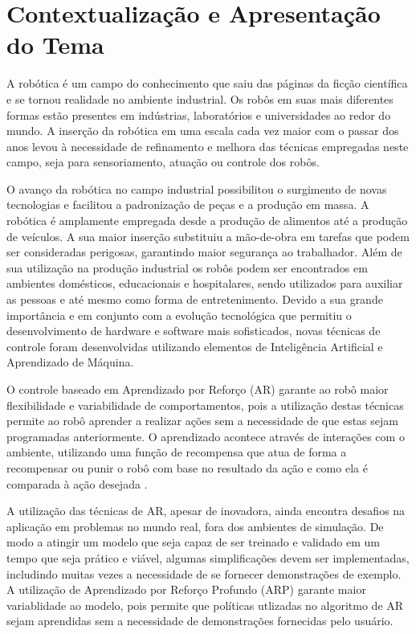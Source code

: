 \documentclass[]{politex}
\begin{document}
\section{Contextualização e Apresentação do Tema}
	A robótica é um campo do conhecimento que saiu das páginas da ficção científica e se tornou realidade no ambiente industrial. Os robôs em suas mais diferentes formas estão presentes em indústrias, laboratórios e universidades ao redor do mundo. A inserção da robótica em uma escala cada vez maior com o passar dos anos levou à necessidade de refinamento e melhora das técnicas empregadas neste campo, seja para sensoriamento, atuação ou controle dos robôs.
	
	O avanço da robótica no campo industrial possibilitou o surgimento de novas tecnologias e facilitou a padronização de peças e a produção em massa. A robótica é amplamente empregada desde a produção de alimentos até a produção de veículos. A sua maior inserção substituiu a mão-de-obra em tarefas que podem ser consideradas perigosas, garantindo maior segurança ao trabalhador. Além de sua utilização na produção industrial os robôs podem ser encontrados em ambientes domésticos, educacionais e hospitalares, sendo utilizados para auxiliar as pessoas e até mesmo como forma de entretenimento. Devido a sua grande importância e em conjunto com a evolução tecnológica que permitiu o desenvolvimento de hardware e software mais sofisticados, novas técnicas de controle foram desenvolvidas utilizando elementos de Inteligência Artificial e Aprendizado de Máquina.
	
	O controle baseado em Aprendizado por Reforço (AR) garante ao robô maior flexibilidade e variabilidade de comportamentos, pois a utilização destas técnicas permite ao robô aprender a realizar ações sem a necessidade de que estas sejam programadas anteriormente. O aprendizado acontece através de interações com o ambiente, utilizando uma função de recompensa que atua de forma a recompensar ou punir o robô com base no resultado da ação e como ela é comparada à ação desejada \citet{kormushev2013reinforcement} .
	
	A utilização das técnicas de AR, apesar de inovadora, ainda encontra desafios na aplicação em problemas no mundo real, fora dos ambientes de simulação. De modo a atingir um modelo que seja capaz de ser treinado e validado em um tempo que seja prático e viável, algumas simplificações devem ser implementadas, includindo muitas vezes a necessidade de se fornecer demonstrações de exemplo. A utilização de Aprendizado por Reforço Profundo (ARP) garante maior variablidade ao modelo, pois permite que políticas utlizadas no algoritmo de AR sejam aprendidas sem a necessidade de demonstrações fornecidas pelo usuário.
	
\end{document}
